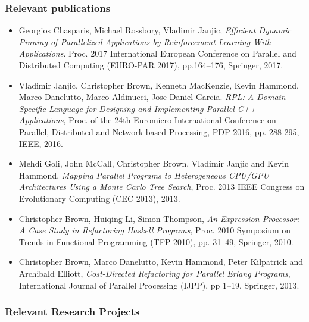 \documentclass[a4paper,11pt]{article}
\begin{document}
\subsubsection*{Relevant publications}
\begin{itemize}
\item Georgios Chasparis, Michael Rossbory, Vladimir Janjic, \emph{Efficient Dynamic Pinning of Parallelized Applications by Reinforcement Learning With Applications}. Proc. 2017 International European Conference on Parallel and Distributed Computing (EURO-PAR 2017), pp.164--176, Springer, 2017. 
\item Vladimir Janjic, Christopher Brown, Kenneth MacKenzie, Kevin Hammond, Marco Danelutto, Marco Aldinucci, Jose Daniel Garcia. \emph{RPL: A Domain-Specific Language for Designing and Implementing Parallel C++ Applications}, 
Proc. of the 24th Euromicro International Conference on Parallel, Distributed and Network-based Processing, PDP 2016, pp. 288-295, IEEE, 2016.
\item Mehdi Goli, John McCall, Christopher Brown, Vladimir Janjic and
  Kevin Hammond, \textit{Mapping Parallel Programs to Heterogeneous
    CPU/GPU Architectures Using a Monte Carlo Tree Search}, Proc. 2013
  IEEE Congress on Evolutionary Computing (CEC 2013), 2013.
\item Christopher Brown, Huiqing Li, Simon Thompson, \textit{An
    Expression Processor: A Case Study in Refactoring Haskell Programs},
  Proc. 2010 Symposium on Trends in Functional Programming (TFP 2010),
  pp. 31--49, Springer, 2010.
\item Christopher Brown, Marco Danelutto, Kevin Hammond, Peter
  Kilpatrick and Archibald Elliott, \textit{Cost-Directed Refactoring
    for Parallel Erlang Programs}, International Journal of Parallel
  Processing (IJPP), pp 1--19, Springer, 2013.
\end{itemize}

\pagebreak
\subsubsection*{Relevant Research Projects}
\end{document}
